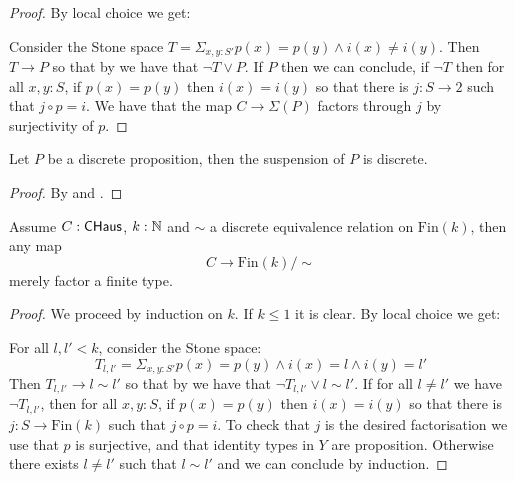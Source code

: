 \begin{proof}
By local choice we get:
\begin{center}
\end{center}
Consider the Stone space $T = \Sigma_{x,y:S'}p(x)=p(y)\land i(x)\not=i(y)$. Then $T\to P$ so that by  we have that $\neg T\lor P$. If $P$ then we can conclude, if $\neg T$ then for all $x,y:S$, if $p(x)=p(y)$ then $i(x)=i(y)$ so that there is $j:S\to 2$ such that $j\circ p=i$. We have that the map $C\to \Sigma(P)$ factors through $j$ by surjectivity of $p$. 
\end{proof}

\begin{corollary}
Let $P$ be a discrete proposition, then the suspension of $P$ is discrete.
\end{corollary}

\begin{proof}
By  and .
\end{proof}

\begin{lemma}\label{factorisation-finite-discrete-quotient}
Assume $C:\mathsf{CHaus}$, $k:\mathbb{N}$ and $\sim$ a discrete equivalence relation on $\mathrm{Fin}(k)$, then any map
\[C\to \mathrm{Fin}(k)/\sim\]
merely factor a finite type.
\end{lemma}

\begin{proof}
We proceed by induction on $k$. If $k\leq 1$ it is clear. By local choice we get:
\begin{center}
\end{center}
For all $l,l'<k$, consider the Stone space:
\[T_{l,l'} = \Sigma_{x,y:S'}p(x)=p(y)\land i(x) = l \land i(y) = l'\] 
Then $T_{l,l'}\to l\sim l'$ so that by  we have that $\neg T_{l,l'}\lor l\sim l'$. If for all $l\not=l'$ we have $\neg T_{l,l'}$, then for all $x,y:S$, if $p(x)=p(y)$ then $i(x)=i(y)$ so that there is $j:S\to \mathrm{Fin}(k)$ such that $j\circ p=i$. To check that $j$ is the desired factorisation we use that $p$ is surjective, and that identity types in $Y$ are proposition. Otherwise there exists $l\not=l'$ such that $l\sim l'$ and we can conclude by induction.
\end{proof}

